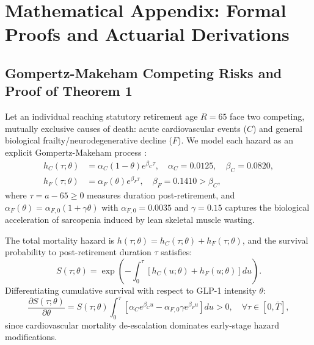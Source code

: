 \documentclass[11pt,a4paper]{article}
\begin{document}
\clearpage
\nocite{*}



\clearpage
\appendix
\section{Mathematical Appendix: Formal Proofs and Actuarial Derivations}
\label{app:proof}

\subsection{Gompertz-Makeham Competing Risks and Proof of Theorem 1}
\label{app:theorem1}
Let an individual reaching statutory retirement age $R = 65$ face two competing, mutually exclusive causes of death: acute cardiovascular events ($C$) and general biological frailty/neurodegenerative decline ($F$). We model each hazard as an explicit Gompertz-Makeham process \citep{vaupel1986biodemography}:
\begin{align}
    h_C(\tau; \theta) &= \alpha_C (1 - \theta) e^{\beta_C \tau}, \quad \alpha_C = 0.0125, \quad \beta_C = 0.0820, \label{eq:hazard_c} \\
    h_F(\tau; \theta) &= \alpha_F(\theta) e^{\beta_F \tau}, \quad \beta_F = 0.1410 > \beta_C, \label{eq:hazard_f}
\end{align}
where $\tau = a - 65 \ge 0$ measures duration post-retirement, and $\alpha_F(\theta) = \alpha_{F, 0} (1 + \gamma \theta)$ with $\alpha_{F, 0} = 0.0035$ and $\gamma = 0.15$ captures the biological acceleration of sarcopenia induced by lean skeletal muscle wasting.

The total mortality hazard is $h(\tau; \theta) = h_C(\tau; \theta) + h_F(\tau; \theta)$, and the survival probability to post-retirement duration $\tau$ satisfies:
\begin{equation}
    S(\tau; \theta) = \exp\left( - \int_0^\tau \left[ h_C(u; \theta) + h_F(u; \theta) \right] du \right).
\end{equation}
Differentiating cumulative survival with respect to GLP-1 intensity $\theta$:
\begin{equation}
    \frac{\partial S(\tau; \theta)}{\partial \theta} = S(\tau; \theta) \int_0^\tau \left[ \alpha_C e^{\beta_C u} - \alpha_{F, 0}\gamma e^{\beta_F u} \right] du > 0, \quad \forall \tau \in [0, \bar{T}],
\end{equation}
since cardiovascular mortality de-escalation dominates early-stage hazard modifications.
\end{document}
